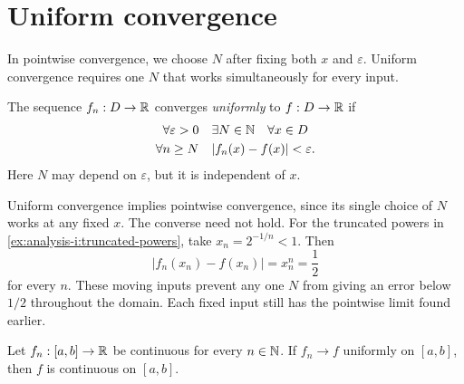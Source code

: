 \section{Uniform convergence}
\label{sec:analysis-i:uniform-convergence}

In pointwise convergence, we choose $N$ after fixing both $x$ and
$\varepsilon$. Uniform convergence requires one $N$ that works
simultaneously for every input.

\begin{definition}
  \label{thm:analysis-i:uniform-convergence}
  The sequence $f_n:D\to\mathbb{R}$ converges \emph{uniformly} to $f:D\to\mathbb{R}$
  if
  \[
    \begin{gathered}
      \forall\varepsilon>0\quad\exists N\in\mathbb{N}\quad\forall x\in D\\
      \forall n\ge N\quad |f_n(x)-f(x)|<\varepsilon.
    \end{gathered}
  \]
  Here $N$ may depend on $\varepsilon$, but it is independent of $x$.
\end{definition}


  Uniform convergence implies pointwise convergence, since its single
  choice of $N$ works at any fixed $x$. The converse need not hold.
  For the truncated powers in \autoref{ex:analysis-i:truncated-powers},
  take $x_n=2^{-1/n}<1$. Then
  \[
    |f_n(x_n)-f(x_n)|=x_n^n=\frac12
  \]
  for every $n$. These moving inputs prevent any one $N$ from giving
  an error below $1/2$ throughout the domain. Each fixed input still
  has the pointwise limit found earlier.


\begin{theorem}
  \label{thm:analysis-i:uniform-limit-continuity}
  Let $f_n:[a,b]\to\mathbb{R}$ be continuous for every $n\in\mathbb{N}$.
  If $f_n\to f$ uniformly on $[a,b]$, then $f$ is continuous on $[a,b]$.
\end{theorem}

